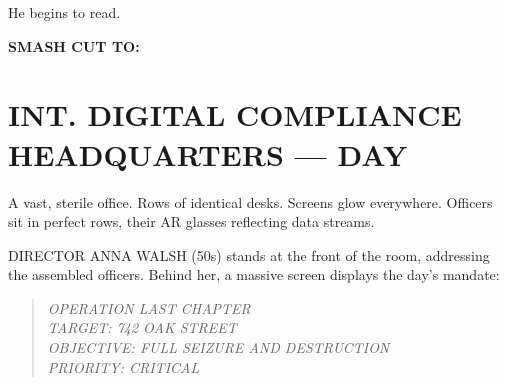 \documentclass[
    language=english,
    doctype=screenplay,
    institution=none,
]{../../omnilatex}
\begin{document}
He begins to read.

\begin{center}
\textbf{SMASH CUT TO:}
\end{center}

\section*{INT. DIGITAL COMPLIANCE HEADQUARTERS --- DAY}

A vast, sterile office. Rows of identical desks. Screens glow everywhere. Officers sit in perfect rows, their AR glasses reflecting data streams.

DIRECTOR ANNA WALSH (50s) stands at the front of the room, addressing the assembled officers. Behind her, a massive screen displays the day's mandate:

\begin{quote}
\textit{OPERATION LAST CHAPTER\\
TARGET: 742 OAK STREET\\
OBJECTIVE: FULL SEIZURE AND DESTRUCTION\\
PRIORITY: CRITICAL}
\end{quote}
\end{document}
